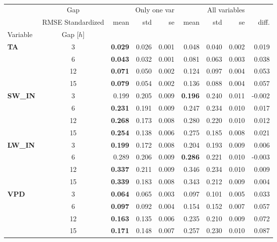 \begin{table}
\centering
\caption{\CapGapSingle}
\label{tbl:gap_single_var}
\begin{tabular}{p{2.1cm}c|rrr|rrr|r}
\toprule
 & Gap & \multicolumn{3}{r}{Only one var} & \multicolumn{3}{r}{All variables} &  \\
 & RMSE Standardized & mean & std & se & mean & std & se & diff. \\
Variable & Gap [$h$] &  &  &  &  &  &  &  \\
\midrule
\multirow[c]{4}{*}{\parbox{2.1cm}{\textbf{TA}}} & 3 & \bfseries 0.029 & 0.026 & 0.001 & 0.048 & 0.040 & 0.002 & 0.019 \\
 & 6 & \bfseries 0.043 & 0.032 & 0.001 & 0.081 & 0.063 & 0.003 & 0.038 \\
 & 12 & \bfseries 0.071 & 0.050 & 0.002 & 0.124 & 0.097 & 0.004 & 0.053 \\
 & 15 & \bfseries 0.079 & 0.054 & 0.002 & 0.136 & 0.088 & 0.004 & 0.057 \\
\cline{1-9}
\multirow[c]{4}{*}{\parbox{2.1cm}{\textbf{SW\_IN}}} & 3 & 0.199 & 0.205 & 0.009 & \bfseries 0.196 & 0.240 & 0.011 & -0.002 \\
 & 6 & \bfseries 0.231 & 0.191 & 0.009 & 0.247 & 0.234 & 0.010 & 0.017 \\
 & 12 & \bfseries 0.268 & 0.173 & 0.008 & 0.280 & 0.220 & 0.010 & 0.012 \\
 & 15 & \bfseries 0.254 & 0.138 & 0.006 & 0.275 & 0.185 & 0.008 & 0.021 \\
\cline{1-9}
\multirow[c]{4}{*}{\parbox{2.1cm}{\textbf{LW\_IN}}} & 3 & \bfseries 0.199 & 0.172 & 0.008 & 0.204 & 0.193 & 0.009 & 0.006 \\
 & 6 & 0.289 & 0.206 & 0.009 & \bfseries 0.286 & 0.221 & 0.010 & -0.003 \\
 & 12 & \bfseries 0.337 & 0.211 & 0.009 & 0.346 & 0.234 & 0.010 & 0.009 \\
 & 15 & \bfseries 0.339 & 0.183 & 0.008 & 0.343 & 0.212 & 0.009 & 0.004 \\
\cline{1-9}
\multirow[c]{4}{*}{\parbox{2.1cm}{\textbf{VPD}}} & 3 & \bfseries 0.064 & 0.065 & 0.003 & 0.097 & 0.101 & 0.005 & 0.033 \\
 & 6 & \bfseries 0.097 & 0.092 & 0.004 & 0.154 & 0.152 & 0.007 & 0.057 \\
 & 12 & \bfseries 0.163 & 0.135 & 0.006 & 0.235 & 0.210 & 0.009 & 0.072 \\
 & 15 & \bfseries 0.171 & 0.148 & 0.007 & 0.257 & 0.230 & 0.010 & 0.087 \\
\cline{1-9}

\end{tabular}
\end{table}
